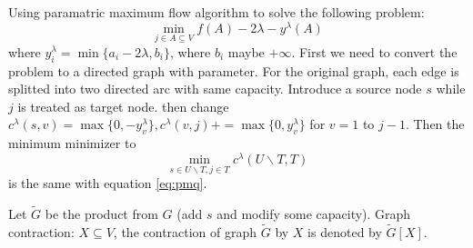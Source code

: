 \documentclass{article}
\begin{document}
Using paramatric maximum flow algorithm to solve the following problem:
\begin{equation}\label{eq:pmq}
\min_{j \in A \subseteq V} f(A) - 2\lambda - y^{\lambda}(A)
\end{equation}
where
$y^{\lambda}_i = \min\{a_i - 2\lambda, b_i\}$, where $b_i$ maybe $+\infty$.
First we need to convert the problem to a directed graph with parameter.
For the original graph, each edge is splitted into two directed arc with same capacity.
Introduce a source node $s$ while $j$ is treated as target node.  then change
$c^{\lambda}(s,v)=\max\{0, -y^{\lambda}_v\}, c^{\lambda}(v,j) += \max\{0, y^{\lambda}_v\}$ for $ v=1 $ to $j-1$. Then the minimum minimizer to 
\begin{equation}\label{eq:pmqe}
\min_{s\in U\backslash T, j\in T}c^{\lambda}(U\backslash T, T)
\end{equation}
is the same with equation \eqref{eq:pmq}.

Let $\widetilde{G}$ be the product from $G$ (add $s$ and modify some capacity). 
Graph contraction: $X\subseteq V$, the contraction of graph $\widetilde{G}$ by $X$ is denoted by $\widetilde{G}[X]$.
\end{document}
